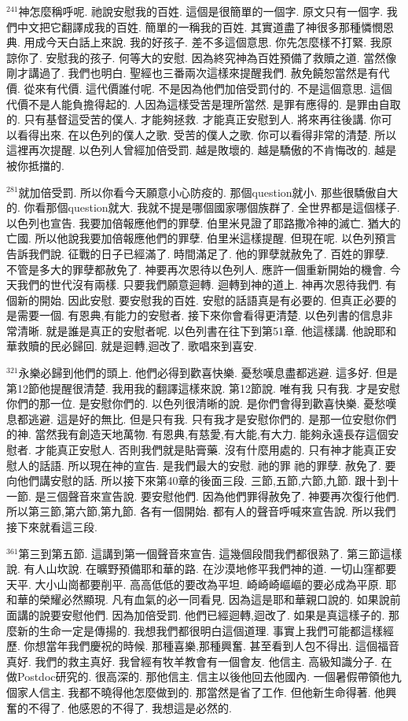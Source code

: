 \documentclass{book}
\begin{document}
$^{241}$神怎麼稱呼呢.
祂說安慰我的百姓.
這個是很簡單的一個字.
原文只有一個字.
我們中文把它翻譯成我的百姓.
簡單的一稱我的百姓.
其實道盡了神很多那種憐憫恩典.
用成今天白話上來說.
我的好孩子.
差不多這個意思.
你先怎麼樣不打緊.
我原諒你了.
安慰我的孩子.
何等大的安慰.
因為終究神為百姓預備了救贖之道.
當然像剛才講過了.
我們也明白.
聖經也三番兩次這樣來提醒我們.
赦免饒恕當然是有代價.
從來有代價.
這代價誰付呢.
不是因為他們加倍受罰付的.
不是這個意思.
這個代價不是人能負擔得起的.
人因為這樣受苦是理所當然.
是罪有應得的.
是罪由自取的.
只有基督這受苦的僕人.
才能夠拯救.
才能真正安慰到人.
將來再往後講.
你可以看得出來.
在以色列的僕人之歌.
受苦的僕人之歌.
你可以看得非常的清楚.
所以這裡再次提醒.
以色列人曾經加倍受罰.
越是敗壞的.
越是驕傲的不肯悔改的.
越是被你抵擋的.

$^{281}$就加倍受罰.
所以你看今天願意小心防疫的.
那個question就小.
那些很驕傲自大的.
你看那個question就大.
我就不提是哪個國家哪個族群了.
全世界都是這個樣子.
以色列也宣告.
我要加倍報應他們的罪孽.
伯里米見證了耶路撒冷神的滅亡.
猶大的亡國.
所以他說我要加倍報應他們的罪孽.
伯里米這樣提醒.
但現在呢.
以色列預言告訴我們說.
征戰的日子已經滿了.
時間滿足了.
他的罪孽就赦免了.
百姓的罪孽.
不管是多大的罪孽都赦免了.
神要再次恩待以色列人.
應許一個重新開始的機會.
今天我們的世代沒有兩樣.
只要我們願意迴轉.
迴轉到神的道上.
神再次恩待我們.
有個新的開始.
因此安慰.
要安慰我的百姓.
安慰的話語真是有必要的.
但真正必要的是需要一個.
有恩典,有能力的安慰者.
接下來你會看得更清楚.
以色列書的信息非常清晰.
就是誰是真正的安慰者呢.
以色列書在往下到第51章.
他這樣講.
他說耶和華救贖的民必歸回.
就是迴轉,迴改了.
歌唱來到喜安.

$^{321}$永樂必歸到他們的頭上.
他們必得到歡喜快樂.
憂愁嘆息盡都逃避.
這多好.
但是第12節他提醒很清楚.
我用我的翻譯這樣來說.
第12節說.
唯有我 只有我.
才是安慰你們的那一位.
是安慰你們的.
以色列很清晰的說.
是你們會得到歡喜快樂.
憂愁嘆息都逃避.
這是好的無比.
但是只有我.
只有我才是安慰你們的.
是那一位安慰你們的神.
當然我有創造天地萬物.
有恩典,有慈愛,有大能,有大力.
能夠永遠長存這個安慰者.
才能真正安慰人.
否則我們就是貼膏藥.
沒有什麼用處的.
只有神才能真正安慰人的話語.
所以現在神的宣告.
是我們最大的安慰.
祂的罪 祂的罪孽.
赦免了.
要向他們講安慰的話.
所以接下來第40章的後面三段.
三節,五節,六節,九節.
跟十到十一節.
是三個聲音來宣告說.
要安慰他們.
因為他們罪得赦免了.
神要再次復行他們.
所以第三節,第六節,第九節.
各有一個開始.
都有人的聲音呼喊來宣告說.
所以我們接下來就看這三段.

$^{361}$第三到第五節.
這講到第一個聲音來宣告.
這幾個段間我們都很熟了.
第三節這樣說.
有人山坎說.
在曠野預備耶和華的路.
在沙漠地修平我們神的道.
一切山窪都要天平.
大小山崗都要削平.
高高低低的要改為平坦.
崎崎崎嶇嶇的要必成為平原.
耶和華的榮耀必然顯現.
凡有血氣的必一同看見.
因為這是耶和華親口說的.
如果說前面講的說要安慰他們.
因為加倍受罰.
他們已經迴轉,迴改了.
如果是真這樣子的.
那麼新的生命一定是傳揚的.
我想我們都很明白這個道理.
事實上我們可能都這樣經歷.
你想當年我們慶祝的時候.
那種喜樂,那種興奮.
甚至看到人包不得出.
這個福音真好.
我們的救主真好.
我曾經有牧羊教會有一個會友.
他信主.
高級知識分子.
在做Postdoc研究的.
很高深的.
那他信主.
信主以後他回去他國內.
一個暑假帶領他九個家人信主.
我都不曉得他怎麼做到的.
那當然是省了工作.
但他新生命得著.
他興奮的不得了.
他感恩的不得了.
我想這是必然的.
\end{document}
